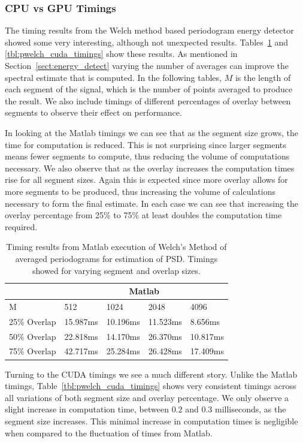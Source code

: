 \subsubsection{CPU vs GPU Timings}
The timing results from the Welch method based periodogram energy detector showed some very interesting, although not unexpected results.  Tables~\ref{tbl:pwelch_matlab_timings} and \ref{tbl:pwelch_cuda_timings} show these results.  As mentioned in Section~\ref{sect:energy_detect} varying the number of averages can improve the spectral estimate that is computed.  In the following tables, $M$ is the length of each segment of the signal, which is the number of points averaged to produce the result.  We also include timings of different percentages of overlay between segments to observe their effect on performance.

In looking at the Matlab timings we can see that as the segment size grows, the time for computation is reduced.  This is not surprising since larger segments means fewer segments to compute, thus reducing the volume of computations necessary.  We also observe that as the overlay increases the computation times rise for all segment sizes.  Again this is expected since more overlay allows for more segments to be produced, thus increasing the volume of calculations necessary to form the final estimate.  In each case we can see that increasing the overlay percentage from 25\% to 75\% at least doubles the computation time required.
 
\begin{table}
\begin{center}
\begin{tabular}{|l|l|l|l|l|}
\hline
 & \multicolumn{4}{|c|}{Matlab} \\
\hline
M & 512 & 1024 & 2048 & 4096 \\
\hline
25\% Overlap & 15.987ms & 10.196ms & 11.523ms & 8.656ms \\
50\% Overlap & 22.818ms & 14.170ms & 26.370ms & 10.817ms \\
75\% Overlap & 42.717ms & 25.284ms & 26.428ms & 17.409ms \\
\hline
\end{tabular}
\caption{Timing results from Matlab execution of Welch's Method of averaged periodograms for estimation of PSD.  Timings showed for varying segment and overlap sizes.}
\label{tbl:pwelch_matlab_timings}
\end{center}
\end{table}

Turning to the CUDA timings we see a much different story.  Unlike the Matlab timings, Table~\ref{tbl:pwelch_cuda_timings} shows very consistent timings across all variations of both segment size and overlay percentage.  We only observe a slight increase in computation time, between $0.2$ and $0.3$ milliseconds, as the segment size increases.  This minimal increase in computation times is negligible when compared to the fluctuation of times from Matlab.

